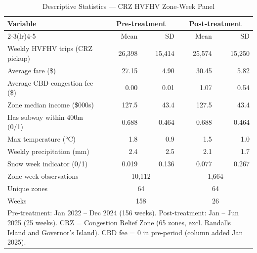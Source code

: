 \begin{table}[htbp]
\centering
\caption{Descriptive Statistics — CRZ HVFHV Zone-Week Panel}
\label{tab:descriptive}
\small
\begin{tabular}{lrrrr}
\toprule
\textbf{Variable} & \multicolumn{2}{c}{\textbf{Pre-treatment}} & \multicolumn{2}{c}{\textbf{Post-treatment}} \\
\cmidrule(lr){2-3}\cmidrule(lr){4-5}
 & Mean & SD & Mean & SD \\
\midrule
Weekly HVFHV trips (CRZ pickup) & 26,398 & 15,414 & 25,574 & 15,250 \\
Average fare (\$) & 27.15 & 4.90 & 30.45 & 5.82 \\
Average CBD congestion fee (\$) & 0.00 & 0.01 & 1.07 & 0.54 \\
Zone median income (\$000s) & 127.5 & 43.4 & 127.5 & 43.4 \\
Has subway within 400m (0/1) & 0.688 & 0.464 & 0.688 & 0.464 \\
Max temperature (°C) & 1.8 & 0.9 & 1.5 & 1.0 \\
Weekly precipitation (mm) & 2.4 & 2.5 & 2.1 & 1.7 \\
Snow week indicator (0/1) & 0.019 & 0.136 & 0.077 & 0.267 \\
\midrule
Zone-week observations & \multicolumn{2}{c}{10,112} & \multicolumn{2}{c}{1,664} \\
Unique zones & \multicolumn{2}{c}{64} & \multicolumn{2}{c}{64} \\
Weeks & \multicolumn{2}{c}{158} & \multicolumn{2}{c}{26} \\

\bottomrule
\multicolumn{999}{l}{\footnotesize Pre-treatment: Jan 2022 -- Dec 2024 (156 weeks). Post-treatment: Jan -- Jun 2025 (25 weeks). CRZ = Congestion Relief Zone (65 zones, excl. Randalls Island and Governor's Island). CBD fee = 0 in pre-period (column added Jan 2025).}\\
\end{tabular}
\end{table}
